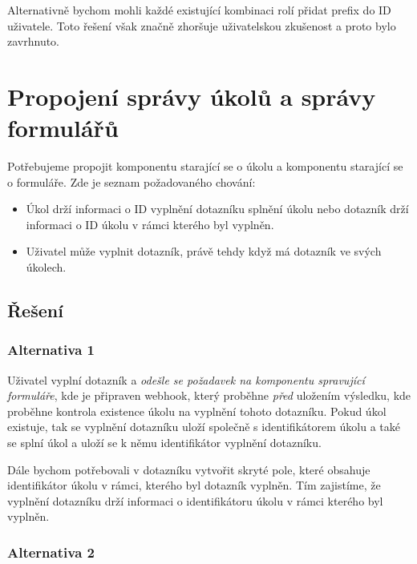 Alternativně bychom mohli každé existující kombinaci rolí přidat prefix do ID uživatele.
Toto řešení však značně zhoršuje uživatelskou zkušenost a proto bylo zavrhnuto.

\section{Propojení správy úkolů a správy formulářů}\label{sec:propojeni-spravy-ukolu-a-spravy-formularu}

Potřebujeme propojit komponentu starající se o úkolu a komponentu starající se o formuláře.
Zde je seznam požadovaného chování:

\begin{itemize}
    \item
    Úkol drží informaci o ID vyplnění dotazníku splnění úkolu nebo dotazník drží informaci o ID úkolu v rámci kterého byl vyplněn.
    \item
    Uživatel může vyplnit dotazník, právě tehdy když má dotazník ve svých úkolech.
\end{itemize}

\subsection{Řešení}\label{subsec:reseni}

\subsubsection{Alternativa 1}\label{subsubsec:alternativa-1}

Uživatel vyplní dotazník a \emph{odešle se požadavek na komponentu spravující formuláře}, kde je připraven webhook, který proběhne \emph{před} uložením výsledku, kde proběhne kontrola existence úkolu na vyplnění tohoto dotazníku.
Pokud úkol existuje, tak se vyplnění dotazníku uloží společně s identifikátorem úkolu a také se splní úkol a uloží se k němu identifikátor vyplnění dotazníku.

Dále bychom potřebovali v dotazníku vytvořit skryté pole, které obsahuje identifikátor úkolu v rámci, kterého byl dotazník vyplněn.
Tím zajistíme, že vyplnění dotazníku drží informaci o identifikátoru úkolu v rámci kterého byl vyplněn.

\subsubsection{Alternativa 2}\label{subsubsec:alternativa-2}

